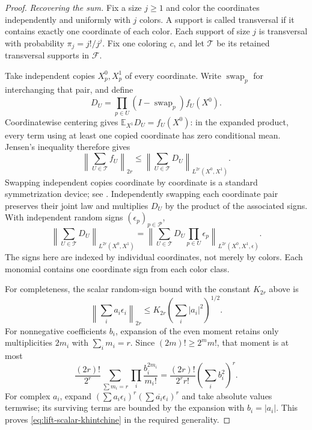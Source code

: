 \begin{proof}
\textit{Recovering the sum.}\quad
Fix a size \(j\ge1\) and color the coordinates independently and
uniformly with \(j\) colors.  A support is called transversal if it
contains exactly one coordinate of each color.  Each support of size
\(j\) is transversal with probability \(\pi_j=j!/j^j\).
Fix one coloring \(c\), and let \(\mathcal T\) be its retained
transversal supports in \(\mathcal F\).

Take independent copies \(X_p^0,X_p^1\) of every coordinate.  Write
\(\operatorname{swap}_p\) for interchanging that pair, and define
\[
 D_U=\prod_{p\in U}(I-\operatorname{swap}_p)f_U(X^0).
\]
Coordinatewise centering gives
\(\mathbb E_{X^1}D_U=f_U(X^0)\): in the expanded product, every
term using at least one copied coordinate has zero conditional mean.
Jensen's inequality therefore gives
\[
 \left\|\sum_{U\in\mathcal T}f_U\right\|_{2r}
 \le\left\|\sum_{U\in\mathcal T}D_U\right\|_{L^{2r}(X^0,X^1)}.
\]
Swapping independent copies coordinate by coordinate is a standard
symmetrization device; see
\cite[Section~4 of the arXiv version]{DeLaPenaMontgomerySmith1995}.
Independently swapping each coordinate pair preserves their joint law
and multiplies \(D_U\) by the product of the associated signs.
With independent random signs \((\epsilon_p)_{p\in\mathcal P}\),
\begin{equation}
 \left\|\sum_{U\in\mathcal T}D_U\right\|_{L^{2r}(X^0,X^1)}
 =\left\|\sum_{U\in\mathcal T}D_U\prod_{p\in U}\epsilon_p
       \right\|_{L^{2r}(X^0,X^1,\epsilon)}.
 \label{eq:lift-sign-symmetrization}
\end{equation}
The signs here are indexed by individual coordinates, not merely by
colors.  Each monomial contains one coordinate sign from each color
class.

For completeness, the scalar random-sign bound with the constant
\(K_{2r}\) above is
\begin{equation}
 \left\|\sum_i a_i\epsilon_i\right\|_{2r}
 \le K_{2r}\left(\sum_i|a_i|^2\right)^{1/2}.
 \label{eq:lift-scalar-khintchine}
\end{equation}
For nonnegative coefficients \(b_i\), expansion of the even moment
retains only multiplicities \(2m_i\) with \(\sum_i m_i=r\).
Since \((2m)!\ge2^m m!\), that moment is at most
\[
 \frac{(2r)!}{2^r}
 \sum_{\sum m_i=r}\prod_i\frac{b_i^{2m_i}}{m_i!}
 =\frac{(2r)!}{2^r r!}\left(\sum_i b_i^2\right)^r.
\]
For complex \(a_i\), expand
\((\sum a_i\epsilon_i)^r(\sum\overline{a_i}\epsilon_i)^r\)
and take absolute values termwise; its surviving terms are bounded by
the expansion with \(b_i=|a_i|\).  This proves
\eqref{eq:lift-scalar-khintchine} in the required generality.


\end{proof}
